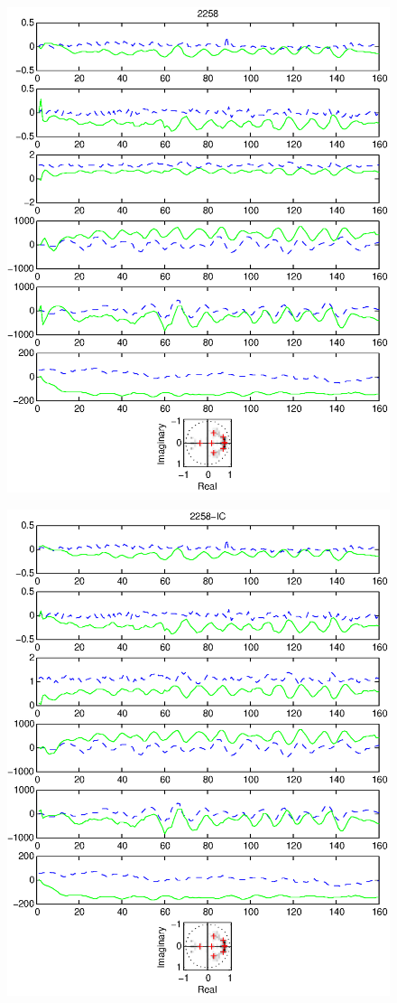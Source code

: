 \documentclass{article}
\begin{document}
\begin{figure}[htb!]\centering
\includegraphics{2258.eps}
\end{figure}\clearpage
\begin{figure}[htb!]\centering
\includegraphics{2258_ic.eps}
\end{figure}\clearpage
\end{document}
